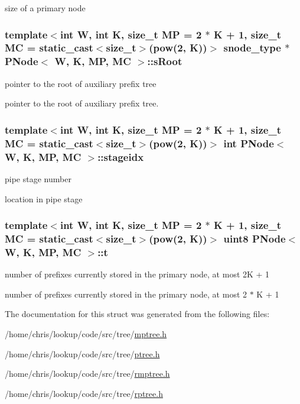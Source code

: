 size of a primary node 

\hypertarget{structPNode_af0f3bf3fceb117941659ee4330c7dc93}{
\subsubsection[{s\-Root}]{\setlength{\rightskip}{0pt plus 5cm}template$<$int W, int K, size\-\_\-t M\-P = 2 $\ast$ K + 1, size\-\_\-t M\-C = static\-\_\-cast$<$size\-\_\-t$>$(pow(2, K))$>$ {\bf snode\-\_\-type} $\ast$ {\bf P\-Node}$<$ {\bf W}, K, M\-P, M\-C $>$\-::s\-Root}}\label{structPNode_af0f3bf3fceb117941659ee4330c7dc93}


pointer to the root of auxiliary prefix tree 

pointer to the root of auxiliary prefix tree. \hypertarget{structPNode_a7da0a256b28772769fa663846dc6ba0e}{
\subsubsection[{stageidx}]{\setlength{\rightskip}{0pt plus 5cm}template$<$int W, int K, size\-\_\-t M\-P = 2 $\ast$ K + 1, size\-\_\-t M\-C = static\-\_\-cast$<$size\-\_\-t$>$(pow(2, K))$>$ int {\bf P\-Node}$<$ {\bf W}, K, M\-P, M\-C $>$\-::stageidx}}\label{structPNode_a7da0a256b28772769fa663846dc6ba0e}


pipe stage number 

location in pipe stage \hypertarget{structPNode_a58484ae1cfa0fe762806f39d5c646234}{
\subsubsection[{t}]{\setlength{\rightskip}{0pt plus 5cm}template$<$int W, int K, size\-\_\-t M\-P = 2 $\ast$ K + 1, size\-\_\-t M\-C = static\-\_\-cast$<$size\-\_\-t$>$(pow(2, K))$>$ {\bf uint8} {\bf P\-Node}$<$ {\bf W}, K, M\-P, M\-C $>$\-::t}}\label{structPNode_a58484ae1cfa0fe762806f39d5c646234}


number of prefixes currently stored in the primary node, at most 2\-K + 1 

number of prefixes currently stored in the primary node, at most 2 $\ast$ K + 1 

The documentation for this struct was generated from the following files\-:\begin{DoxyCompactItemize}
\item 
/home/chris/lookup/code/src/tree/\hyperlink{mptree_8h}{mptree.\-h}\item 
/home/chris/lookup/code/src/tree/\hyperlink{ptree_8h}{ptree.\-h}\item 
/home/chris/lookup/code/src/tree/\hyperlink{rmptree_8h}{rmptree.\-h}\item 
/home/chris/lookup/code/src/tree/\hyperlink{rptree_8h}{rptree.\-h}\end{DoxyCompactItemize}
